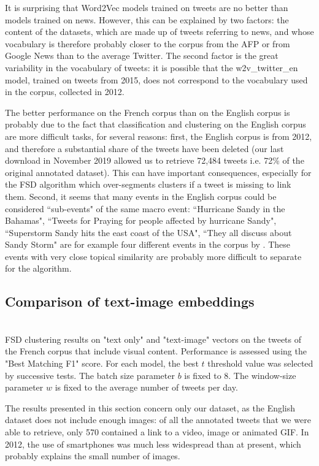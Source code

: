 It is surprising that Word2Vec models trained on tweets are no better than models trained on news. However, this can be explained by two factors: the content of the datasets, which are made up of tweets referring to news, and whose vocabulary is therefore probably closer to the corpus from the AFP or from Google News than to the average Twitter. The second factor is the great variability in the vocabulary of tweets: it is possible that the w2v\_twitter\_en model, trained on tweets from 2015, does not correspond to the vocabulary used in the \citet{mcminn_building_2013} corpus, collected in 2012.

The better performance on the French corpus than on the English corpus is probably due to the fact that classification
and clustering on the English corpus are more difficult tasks, for several reasons: first, the English corpus is from
2012, and therefore a substantial share of the tweets have been deleted (our last download in November 2019 allowed us to
retrieve 72,484 tweets i.e. 72\% of the original annotated dataset). This can have important consequences,
especially for the FSD algorithm which over-segments clusters if a tweet is missing to link them.
Second, it seems that many events in the English corpus could be considered
``sub-events" of the same macro event:
``Hurricane Sandy in the Bahamas", ``Tweets for Praying for people affected by hurricane Sandy", ``Superstorm Sandy
hits the east coast of the USA", ``They all discuss about Sandy Storm" are for example four different events in the
corpus by \citet{mcminn_building_2013}. These events with very close topical similarity are probably more difficult to
separate for the algorithm.

\subsection{Comparison of text-image embeddings}
\label{Subsec: text-image embeddings}
\begin{table}[ht]
\begin{center}

\\

\caption[FSD clustering results on "text only" and "text-image" vectors]{FSD clustering results on "text only" and "text-image" vectors on the tweets of the French corpus that include visual content. Performance is assessed using the "Best Matching F1" score. For each model, the best $t$ threshold value was selected by successive tests. The batch size parameter $b$ is fixed to 8. The window-size parameter $w$ is fixed to the average number of tweets per day.} \label{Tab: text_image}
\end{center}
\end{table}
The results presented in this section concern only our dataset, as the English dataset does not include enough images: of all the annotated tweets that we were able to retrieve, only 570 contained a link to a video, image or animated GIF. In 2012, the use of smartphones was much less widespread than at present, which probably explains the small number of images.

